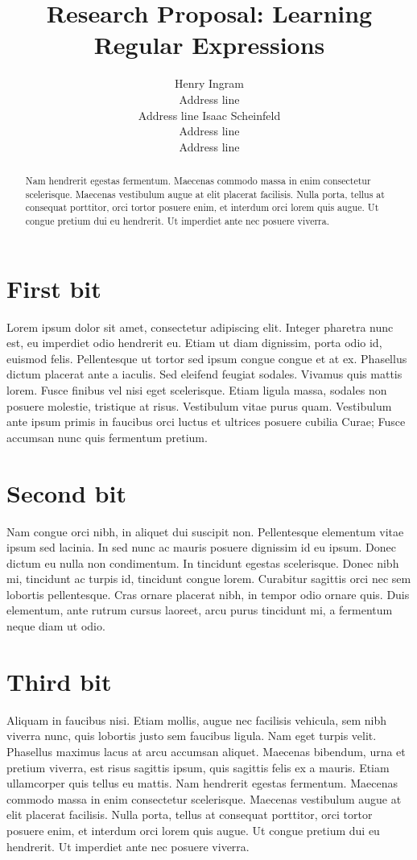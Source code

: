 \documentclass[letterpaper]{article}
\title{Research Proposal: Learning Regular Expressions}
\author{Henry Ingram\\ Address line \\ Address line \And
Isaac Scheinfeld \\ Address line \\ Address line}
\begin{document}
\maketitle
\begin{abstract}
  Nam hendrerit egestas fermentum. Maecenas commodo massa in enim consectetur scelerisque. Maecenas vestibulum augue at elit placerat facilisis. Nulla porta, tellus at consequat porttitor, orci tortor posuere enim, et interdum orci lorem quis augue. Ut congue pretium dui eu hendrerit. Ut imperdiet ante nec posuere viverra.

\end{abstract}

\section{First bit}

Lorem ipsum dolor sit amet, consectetur adipiscing elit. Integer pharetra nunc est, eu imperdiet odio hendrerit eu. Etiam ut diam dignissim, porta odio id, euismod felis. Pellentesque ut tortor sed ipsum congue congue et at ex. Phasellus dictum placerat ante a iaculis. Sed eleifend feugiat sodales. Vivamus quis mattis lorem. Fusce finibus vel nisi eget scelerisque. Etiam ligula massa, sodales non posuere molestie, tristique at risus. Vestibulum vitae purus quam. Vestibulum ante ipsum primis in faucibus orci luctus et ultrices posuere cubilia Curae; Fusce accumsan nunc quis fermentum pretium.

\section{Second bit}

Nam congue orci nibh, in aliquet dui suscipit non. Pellentesque elementum vitae ipsum sed lacinia. In sed nunc ac mauris posuere dignissim id eu ipsum. Donec dictum eu nulla non condimentum. In tincidunt egestas scelerisque. Donec nibh mi, tincidunt ac turpis id, tincidunt congue lorem. Curabitur sagittis orci nec sem lobortis pellentesque. Cras ornare placerat nibh, in tempor odio ornare quis. Duis elementum, ante rutrum cursus laoreet, arcu purus tincidunt mi, a fermentum neque diam ut odio.

\section{Third bit}

Aliquam in faucibus nisi. Etiam mollis, augue nec facilisis vehicula, sem nibh viverra nunc, quis lobortis justo sem faucibus ligula. Nam eget turpis velit. Phasellus maximus lacus at arcu accumsan aliquet. Maecenas bibendum, urna et pretium viverra, est risus sagittis ipsum, quis sagittis felis ex a mauris. Etiam ullamcorper quis tellus eu mattis. Nam hendrerit egestas fermentum. Maecenas commodo massa in enim consectetur scelerisque. Maecenas vestibulum augue at elit placerat facilisis. Nulla porta, tellus at consequat porttitor, orci tortor posuere enim, et interdum orci lorem quis augue. Ut congue pretium dui eu hendrerit. Ut imperdiet ante nec posuere viverra.

 
 
 
\end{document}
